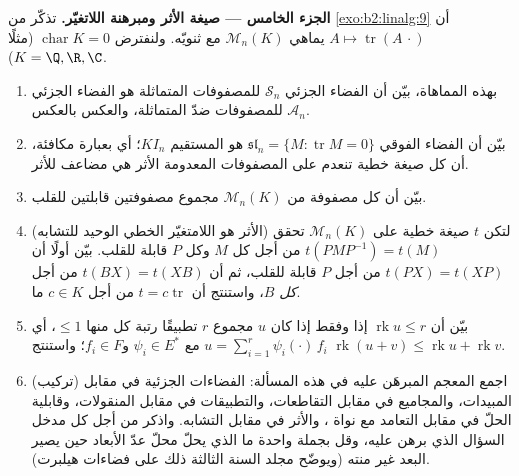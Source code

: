 \begin{problem}
\medskip
\noindent\textbf{الجزء الخامس --- صيغة الأثر ومبرهنة
اللاتغيّر.} تذكّر من \cref{exo:b2:linalg:9} أن $A \mapsto
\operatorname{tr}(A\,\cdot)$ يماهي $\mathcal{M}_n(K)$ مع
ثنويّه. ولنفترض $\operatorname{char} K = 0$ (مثلًا $K = \Q, \R,
\C$).
\begin{enumerate}[resume]
  \item بهذه المماهاة، بيّن أن  الفضاء الجزئي
        $\mathcal{S}_n$ للمصفوفات المتماثلة هو الفضاء
        الجزئي $\mathcal{A}_n$ للمصفوفات ضدّ المتماثلة، والعكس
        بالعكس.
  \item بيّن أن  الفضاء الفوقي
        $\mathfrak{sl}_n = \{M : \operatorname{tr} M = 0\}$ هو
        المستقيم $K I_n$؛ أي بعبارة مكافئة، أن كل صيغة خطية تنعدم
        على المصفوفات المعدومة الأثر هي مضاعف للأثر.
  \item بيّن أن كل مصفوفة من $\mathcal{M}_n(K)$ مجموع
        مصفوفتين قابلتين للقلب.
  \item (الأثر هو اللامتغيّر الخطي الوحيد للتشابه) لتكن
        $t$ صيغة خطية على $\mathcal{M}_n(K)$ تحقق
        $t(PMP^{-1}) = t(M)$ من أجل كل $M$ وكل $P$
        قابلة للقلب. بيّن أولًا أن $t(PX) = t(XP)$ من أجل $P$ قابلة للقلب، ثم
        أن $t(BX) = t(XB)$ من أجل \emph{كل} $B$، واستنتج أن $t = c
        \operatorname{tr}$ من أجل $c \in K$ ما.
  \item بيّن أن $\operatorname{rk} u \leq r$ إذا وفقط إذا كان $u$
        مجموع $r$ تطبيقًا رتبة كل منها $\leq 1$، أي $u =
        \sum_{i=1}^{r} \psi_i(\cdot)\,f_i$ مع $\psi_i \in E^*$
        و$f_i \in F$؛ واستنتج $\operatorname{rk}(u + v) \leq
        \operatorname{rk} u + \operatorname{rk} v$.
  \item (تركيب) اجمع المعجم المبرهَن عليه في هذه المسألة:
        الفضاءات الجزئية في مقابل المبيدات، والمجاميع في
        مقابل التقاطعات، والتطبيقات في مقابل المنقولات، وقابلية
        الحلّ في مقابل التعامد مع نواة ، والأثر في مقابل
        التشابه. واذكر من أجل كل مدخل السؤال الذي برهن عليه،
        وقل بجملة واحدة ما الذي يحلّ محلّ عدّ الأبعاد حين يصير
        البعد غير منته (ويوضّح مجلد السنة الثالثة ذلك
        على فضاءات هيلبرت).
\end{enumerate}
\end{problem}
